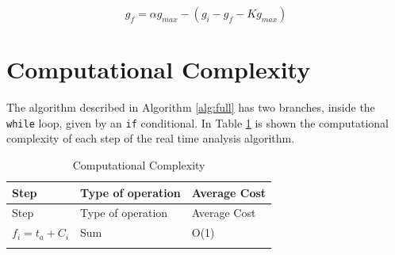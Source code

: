 \documentclass[
  12pt,
  a4paperpaper,
]{report}
\begin{document}
\begin{equation}
g_f = \alpha g_{max} - (g_i -  g_f - K g_{max} )
\label{eq:new_g_f}
\end{equation}

\hypertarget{computational-complexity}{%
\section{Computational Complexity}\label{computational-complexity}}

The algorithm described in Algorithm \ref{alg:full} has two branches,
inside the \texttt{while} loop, given by an \texttt{if} conditional. In
Table \ref{tab:bigO} is shown the computational complexity of each step
of the real time analysis algorithm.

\begin{longtable}[]{@{}lll@{}}
\caption{Computational Complexity \label{tab:bigO}}\tabularnewline
\toprule
\begin{minipage}[b]{0.52\columnwidth}\raggedright
Step\strut
\end{minipage} & \begin{minipage}[b]{0.24\columnwidth}\raggedright
Type of operation\strut
\end{minipage} & \begin{minipage}[b]{0.15\columnwidth}\raggedright
Average Cost\strut
\end{minipage}\tabularnewline
\midrule
\endfirsthead
\toprule
\begin{minipage}[b]{0.52\columnwidth}\raggedright
Step\strut
\end{minipage} & \begin{minipage}[b]{0.24\columnwidth}\raggedright
Type of operation\strut
\end{minipage} & \begin{minipage}[b]{0.15\columnwidth}\raggedright
Average Cost\strut
\end{minipage}\tabularnewline
\midrule
\endhead
\begin{minipage}[t]{0.52\columnwidth}\raggedright
\(f_i = t_a + C_i\)\strut
\end{minipage} & \begin{minipage}[t]{0.24\columnwidth}\raggedright
Sum\strut
\end{minipage} & \begin{minipage}[t]{0.15\columnwidth}\raggedright
O(1)\strut
\end{minipage}\tabularnewline
\begin{minipage}[t]{0.52\columnwidth}\raggedright

\end{minipage}
\end{longtable}
\end{document}
